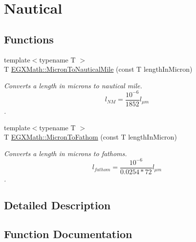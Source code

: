 \hypertarget{group___e_g_x_math-_conversions-_length_conversions-_non-_s_i-_micron-_nautical}{}\section{Nautical}
\label{group___e_g_x_math-_conversions-_length_conversions-_non-_s_i-_micron-_nautical}
\subsection*{Functions}
\begin{DoxyCompactItemize}
\item 
{\footnotesize template$<$typename T $>$ }\\T \mbox{\hyperlink{group___e_g_x_math-_conversions-_length_conversions-_non-_s_i-_micron-_nautical_gaa3944ed4bca9dcd37c3043d44cc36bf1}{E\+G\+X\+Math\+::\+Micron\+To\+Nautical\+Mile}} (const T length\+In\+Micron)
\begin{DoxyCompactList}\small\item\em Converts a length in microns to nautical mile. \[ l_{NM}= \frac{10^{-6}}{1852} l_{\mu m} \]. \end{DoxyCompactList}\item 
{\footnotesize template$<$typename T $>$ }\\T \mbox{\hyperlink{group___e_g_x_math-_conversions-_length_conversions-_non-_s_i-_micron-_nautical_ga5cb74ac25926c826943b859a582a5e6a}{E\+G\+X\+Math\+::\+Micron\+To\+Fathom}} (const T length\+In\+Micron)
\begin{DoxyCompactList}\small\item\em Converts a length in microns to fathoms. \[ l_{fathom}= \frac{10^{-6}}{0.0254 * 72} l_{\mu m} \]. \end{DoxyCompactList}\end{DoxyCompactItemize}


\subsection{Detailed Description}


\subsection{Function Documentation}
\mbox{\label{group___e_g_x_math-_conversions-_length_conversions-_non-_s_i-_micron-_nautical_ga5cb74ac25926c826943b859a582a5e6a}} 
